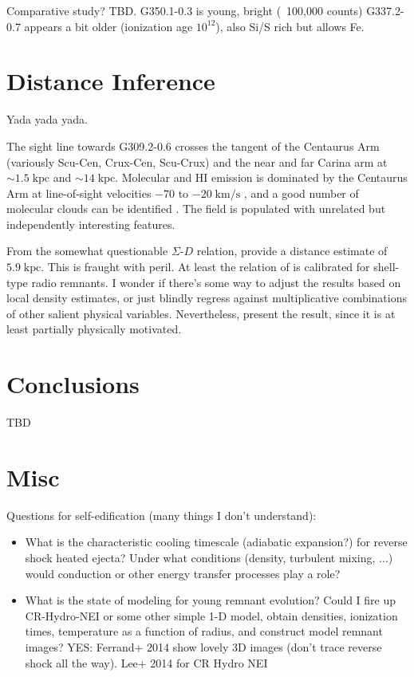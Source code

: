 \documentclass[preprint2,tighten,trackchanges]{aastex6}
\newcommand*{\mt}{\mathrm}
\newcommand*{\unit}[1]{\;\mt{#1}}  %
\newcommand*{\abt}{\mathord{\sim}} %
\begin{document}
Comparative study?  TBD.
G350.1-0.3 is young, bright (~100,000 counts)
G337.2-0.7 appears a bit older (ionization age $10^12$), also Si/S rich but
allows Fe.

\section{Distance Inference}

Yada yada yada.

The sight line towards G309.2-0.6 crosses the tangent of the Centaurus Arm
(variously Scu-Cen, Crux-Cen, Scu-Crux) and the near and far Carina arm at
$\abt 1.5 \unit{kpc}$ and $\abt 14 \unit{kpc}$.  Molecular and HI emission is
dominated by the Centaurus Arm at line-of-sight velocities $-70$ to
$-20 \unit{km/s}$ \citep[e.g.,][Figure 4]{dame2011}, and a good number of
molecular clouds can be identified \citep{rice2016}.  The field is populated
with unrelated but independently interesting features.

From the somewhat questionable $\Sigma$-$D$ relation, \citet{pavlovic2014}
provide a distance estimate of $5.9 \unit{kpc}$.
This is fraught with peril.
At least the relation of \citet{pavlovic2014} is calibrated for shell-type
radio remnants.
I wonder if there's some way to adjust the results based on local density
estimates, or just blindly regress against multiplicative combinations of other
salient physical variables.
Nevertheless, present the result, since it is at least partially physically
motivated.

\section{Conclusions}

TBD

\section{Misc}

Questions for self-edification (many things I don't understand):
\begin{itemize}
    \item What is the characteristic cooling timescale (adiabatic expansion?)
        for reverse shock heated ejecta?
        Under what conditions (density, turbulent mixing, ...)
        would conduction or other energy transfer processes play a role?
    \item What is the state of modeling for young remnant evolution?
        Could I fire up CR-Hydro-NEI or some other simple 1-D model,
        obtain densities, ionization times, temperature as a function of
        radius, and construct model remnant images?
        YES: Ferrand+ 2014 show lovely 3D images (don't trace reverse shock all
        the way).
        Lee+ 2014 for CR Hydro NEI
\end{itemize}
\end{document}

